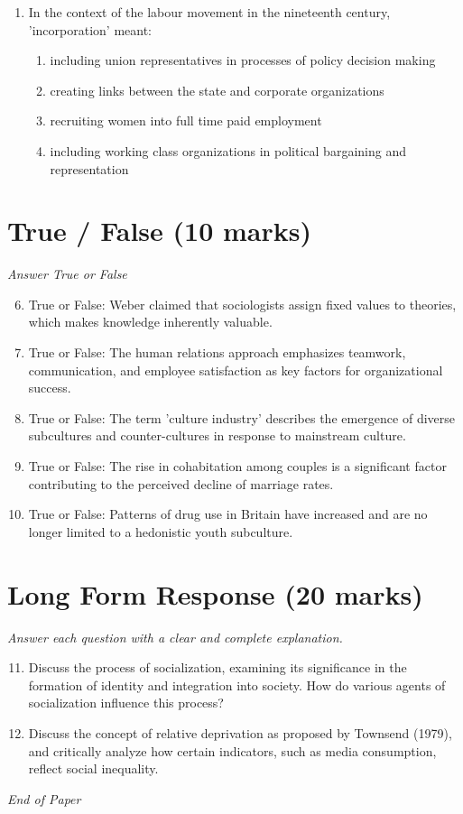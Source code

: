 \documentclass[12pt]{article}
\begin{document}
\begin{enumerate}[label=\arabic*.]
\begin{enumerate}[label=(\alph*)]
    \item each other and humanity in general
    \item all of the above
\end{enumerate}
\item In the context of the labour movement in the nineteenth century, 'incorporation' meant:
\begin{enumerate}[label=(\alph*)]
    \item including union representatives in processes of policy decision making
    \item creating links between the state and corporate organizations
    \item recruiting women into full time paid employment
    \item including working class organizations in political bargaining and representation
\end{enumerate}
\end{enumerate}

\section*{True / False (10 marks)}
\textit{Answer True or False}
\begin{enumerate}[label=\arabic*.]
\setcounter{enumi}{5}
\item True or False: Weber claimed that sociologists assign fixed values to theories, which makes knowledge inherently valuable.
\item True or False: The human relations approach emphasizes teamwork, communication, and employee satisfaction as key factors for organizational success.
\item True or False: The term 'culture industry' describes the emergence of diverse subcultures and counter-cultures in response to mainstream culture.
\item True or False: The rise in cohabitation among couples is a significant factor contributing to the perceived decline of marriage rates.
\item True or False: Patterns of drug use in Britain have increased and are no longer limited to a hedonistic youth subculture.
\end{enumerate}

\section*{Long Form Response (20 marks)}
\textit{Answer each question with a clear and complete explanation.}
\begin{enumerate}[label=\arabic*.]
\setcounter{enumi}{10}
\item Discuss the process of socialization, examining its significance in the formation of identity and integration into society. How do various agents of socialization influence this process?
\item Discuss the concept of relative deprivation as proposed by Townsend (1979), and critically analyze how certain indicators, such as media consumption, reflect social inequality.
\end{enumerate}

\vfill
\noindent\textit{End of Paper}
\end{document}
